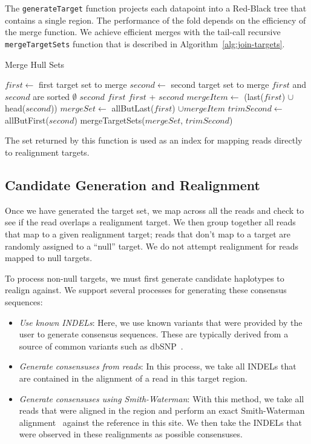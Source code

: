 \documentclass[phd]{ucbthesis}
\begin{document}
The \texttt{generateTarget} function projects each datapoint into a Red-Black tree that contains a
single region. The performance of the fold depends on the efficiency of the merge function. We achieve
efficient merges with the tail-call recursive \texttt{mergeTargetSets} function that is described in
Algorithm~\ref{alg:join-targets}.

\begin{algorithm}
\caption{Merge Hull Sets}
\label{alg:join-targets}
\begin{algorithmic}
\STATE $first \leftarrow$ first target set to merge
\STATE $second \leftarrow$ second target set to merge
\REQUIRE $first$ and $second$ are sorted
\RETURN $\emptyset$
\RETURN $second$
\RETURN $first$
\ELSE
{}
\RETURN $first$ + $second$
\ELSE
\STATE $mergeItem \leftarrow$ (last($first$) $\cup$ head($second$))
\STATE $mergeSet \leftarrow$ allButLast($first$) $\cup mergeItem$
\STATE $trimSecond \leftarrow$ allButFirst($second$)
\RETURN mergeTargetSets($mergeSet$, $trimSecond$)
\ENDIF
\ENDIF
\end{algorithmic}
\end{algorithm}

The set returned by this function is used as an index for mapping reads directly to realignment targets.

\subsection{Candidate Generation and Realignment}
\label{sec:candidate-generation-realignment}

Once we have generated the target set, we map across all the reads and check to see if the read overlaps
a realignment target. We then group together all reads that map to a given realignment target; reads that
don't map to a target are randomly assigned to a ``null'' target. We do not attempt realignment for reads mapped
to null targets.

To process non-null targets, we must first generate candidate haplotypes to realign against. We support several
processes for generating these consensus sequences:

\begin{itemize}
\item \emph{Use known INDELs}: Here, we use known variants that were provided by the user to generate
consensus sequences. These are typically derived from a source of common variants such as dbSNP~\cite{sherry01}.
\item \emph{Generate consensuses from reads}: In this process, we take all INDELs that are contained in
the alignment of a read in this target region.
\item \emph{Generate consensuses using Smith-Waterman}: With this method, we take all reads that were
aligned in the region and perform an exact Smith-Waterman alignment~\cite{smith81} against the reference in this site. We
then take the INDELs that were observed in these realignments as possible consensuses. 
\end{itemize}
\end{document}
